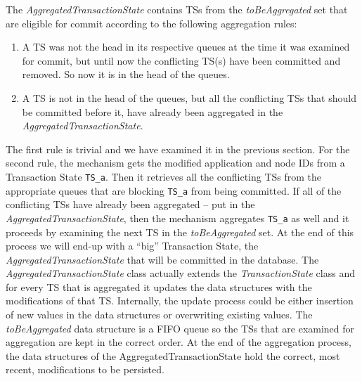 The \emph{AggregatedTransactionState} contains TSs from the
\emph{toBeAggregated} set that are eligible for commit according to the
following aggregation rules:
\begin{enumerate}
  \item A TS was not the head in its respective queues at the time it
    was examined for commit, but until now the conflicting TS(s) have
    been committed and removed. So now it is in the head of the
    queues.

  \item A TS is not in the head of the queues, but all the
    conflicting TSs that should be committed before it, have already been
    aggregated in the \emph{AggregatedTransactionState}.
\end{enumerate}

The first rule is trivial and we have examined it in the previous
section. For the second rule, the mechanism gets the modified
application and node IDs from a Transaction State \texttt{TS\_a}.
Then it retrieves all the conflicting TSs from the appropriate queues
that are blocking \texttt{TS\_a} from being committed. If all of the
conflicting TSs have already been aggregated -- put in the
\emph{AggregatedTransactionState}, then the mechanism aggregates
\texttt{TS\_a} as well and it proceeds by examining the next TS in the
\emph{toBeAggregated} set. At the end of this process we will end-up
with a ``big'' Transaction State, the
\emph{AggregatedTransactionState} that will be committed in the
database. The \emph{AggregatedTransactionState} class actually extends
the \emph{TransactionState} class and for every TS that is aggregated
it updates the data structures with the modifications of that
TS. Internally, the update process
could be either insertion of new values in the data structures
or overwriting existing values. The
\emph{toBeAggregated} data structure is a FIFO queue so the TSs that
are examined for aggregation are kept in the correct order. At the
end of the aggregation process, the data structures of the
AggregatedTransactionState hold the correct, most recent, modifications to be persisted.


